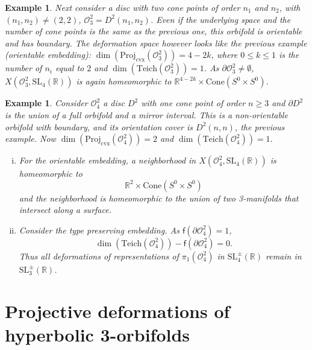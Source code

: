 \documentclass[a4paper,11pt]{article}
\newtheorem{Example}[Theorem]{Example}
\begin{document}
  
 

   \begin{Example} Next consider a disc with 
   two cone points of order $n_1$ and $n_2$, with $(n_1,n_2)\neq (2,2)$, 
        $\mathcal O^2_3=D^2(n_1,n_2)$. Even if the underlying space and the number of 
        cone points is the same as the previous one,
        this orbifold is orientable and has boundary. 
        The deformation space however looks like the previous example (orientable embedding):   
        $\dim  (   \mathrm{Proj}_{\mathrm{cvx}}(\mathcal O^2_3))= 4-2 k $, where 
  $0\leq k\leq 1$ is the number of $n_i$ equal to $2$ and 
  $\dim (\mathrm{Teich}(\mathcal O^2_3))=1$.  As $\partial \mathcal O^2_3
  \neq\emptyset$,  $X(\mathcal O^2_3, \mathrm{SL}_4(\mathbb R))$ is again homeomorphic to 
  $
  \mathbb R^{4-2k}\times  \mathrm{Cone}( S^{0}\times S^0)
   $.
   \end{Example}

 
 
   \begin{Example}
   \label{Example:On}
   Consider $\mathcal O^2_4$ a disc $D^2$ with one cone point of order $n\geq 3$
   and $\partial D^2$ is the union of a full orbifold and a mirror interval. 
    This is a non-orientable orbifold with boundary, and its 
    orientation cover is $D^2(n, n)$, the previous example. 
    Now  $\dim  (   \mathrm{Proj}_{\mathrm{cvx}}(\mathcal O^2_4))= 2 $
     and 
     $\dim (\mathrm{Teich}(\mathcal O^2_4))=1$.  
       \begin{enumerate}[(i)]
   \item For the orientable embedding, a neighborhood in
   $X(\mathcal O^2_4, \mathrm{SL}_4(\mathbb R))$ is homeomorphic to 
  $$
  \mathbb R^{2}\times  \mathrm{Cone}( S^{0}\times S^0)
  $$
  and the neighborhood is homeomorphic to the union of two 3-manifolds
  that intersect along a surface.  
  \item Consider the type preserving embedding. As $\mathsf{f}(\partial \mathcal O^2_4)= 1$, 
  $$\dim (\mathrm{Teich}(\mathcal O^2_4))- 
  \mathsf{f}(\partial \mathcal O^2_4)=0.$$
  Thus all deformations of representations of $\pi_1(\mathcal O^2_4)$
  in $\mathrm{SL}^{\pm}_4(\mathbb R)$ remain in
  $\mathrm{SL}^{\pm}_3(\mathbb R)$.
    \end{enumerate}
     
    
     
    
   \end{Example}


\section{Projective deformations of hyperbolic 3-orbifolds}
\label{Section:projdef3}
\end{document}
